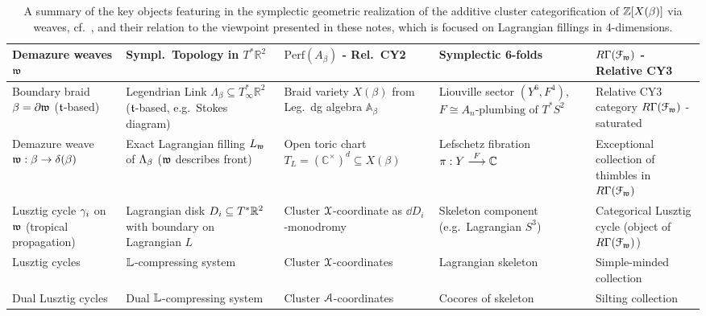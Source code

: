 \tiny
\begin{center}
\begin{table}
\centering
  \caption{A summary of the key objects featuring in the symplectic geometric realization of the additive cluster categorification of $\Z[X(\beta)]$ via weaves, cf.~\cite{CasalsChrist,CasalsChrist2}, and their relation to the viewpoint presented in these notes, which is focused on Lagrangian fillings in 4-dimensions.}
  \label{tab:weaves_6D_symplectic}
\qquad\begin{tabular}{ |P{3cm}|P{4cm}|P{3cm}|P{3.5cm}|P{3.5cm}|}
	\hline
    
	{\bf Demazure weaves $\w$} & {\bf Sympl.~Topology in $T^*\mathbb{R}^2$} & {\bf $\mbox{Perf}(A_\beta)$ - Rel.~CY2} & {\bf Symplectic 6-folds} & {\bf $R\Gamma(\mathcal{F}_\w)$ - Relative CY3}\\
	\hline
    
	Boundary braid $\beta=\dd\w$ ($\tt$-based) & Legendrian Link $\Lambda_\beta\subseteq T^*_\infty\mathbb{R}^2$ ($\tt$-based, e.g.~Stokes diagram) & Braid variety $X(\beta)$ from Leg.~dg algebra $\mathbb{A}_\beta$ & Liouville sector $(Y^6,F^4)$, $F\cong A_n\mbox{-plumbing of } T^*S^2$ & Relative CY3 category $R\Gamma(\mathcal{F}_\w)$ - saturated\\
	\hline
    
	Demazure weave $\w:\beta\to\delta(\beta)$ &  Exact Lagrangian filling $L_\w$ of $\La_\beta$ ($\w$ describes front) & Open toric chart $T_L=(\mathbb{C}^\times)^{d}\subseteq X(\beta)$ & Lefschetz fibration $\pi:Y\stackrel{F}{\lr}\cC$ & Exceptional collection of thimbles in $R\Gamma(\mathcal{F}_\w)$\\
	\hline

    Lusztig cycle $\g_i$ on $\w$ (tropical propagation) & Lagrangian disk $D_i\sse T^*\R^2$ with boundary on Lagrangian $L$ & Cluster $\SX$-coordinate as $\dd D_i$-monodromy & Skeleton component (e.g.~Lagrangian $S^3$) & Categorical Lusztig cycle (object of $R\Gamma(\mathcal{F}_\w)$)\\
	
	\hline
    
	  Lusztig cycles & $\lL$-compressing system  & Cluster $\SX$-coordinates & Lagrangian skeleton & Simple-minded collection\\
	
	\hline
    
	Dual Lusztig cycles & Dual $\lL$-compressing system & Cluster $\SA$-coordinates & Cocores of skeleton & Silting collection\\
	

\end{tabular}
\end{table}
\end{center}
